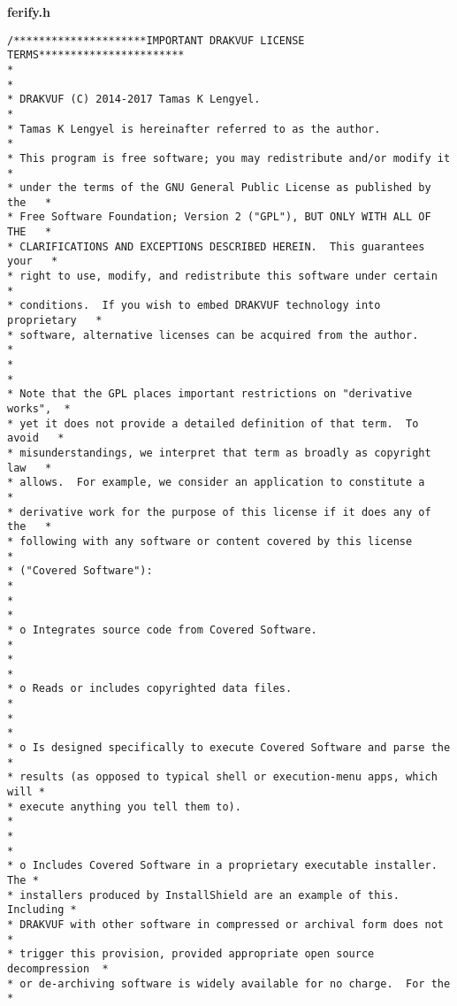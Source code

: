 \textbf{ferify.h}
\selectfont
\begin{lstlisting}[style=CStyle]
/*********************IMPORTANT DRAKVUF LICENSE TERMS***********************
*                                                                         *
* DRAKVUF (C) 2014-2017 Tamas K Lengyel.                                  *
* Tamas K Lengyel is hereinafter referred to as the author.               *
* This program is free software; you may redistribute and/or modify it    *
* under the terms of the GNU General Public License as published by the   *
* Free Software Foundation; Version 2 ("GPL"), BUT ONLY WITH ALL OF THE   *
* CLARIFICATIONS AND EXCEPTIONS DESCRIBED HEREIN.  This guarantees your   *
* right to use, modify, and redistribute this software under certain      *
* conditions.  If you wish to embed DRAKVUF technology into proprietary   *
* software, alternative licenses can be acquired from the author.          *
*                                                                         *
* Note that the GPL places important restrictions on "derivative works",  *
* yet it does not provide a detailed definition of that term.  To avoid   *
* misunderstandings, we interpret that term as broadly as copyright law   *
* allows.  For example, we consider an application to constitute a        *
* derivative work for the purpose of this license if it does any of the   *
* following with any software or content covered by this license          *
* ("Covered Software"):                                                   *
*                                                                         *
* o Integrates source code from Covered Software.                         *
*                                                                         *
* o Reads or includes copyrighted data files.                             *
*                                                                         *
* o Is designed specifically to execute Covered Software and parse the    *
* results (as opposed to typical shell or execution-menu apps, which will *
* execute anything you tell them to).                                     *
*                                                                         *
* o Includes Covered Software in a proprietary executable installer.  The *
* installers produced by InstallShield are an example of this.  Including *
* DRAKVUF with other software in compressed or archival form does not     *
* trigger this provision, provided appropriate open source decompression  *
* or de-archiving software is widely available for no charge.  For the    *

\end{lstlisting}
